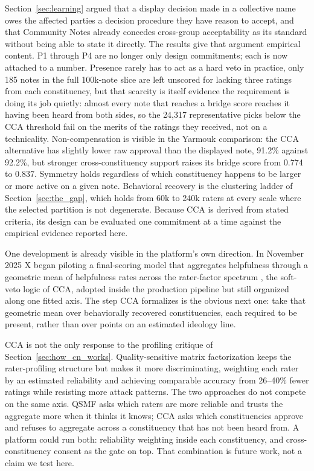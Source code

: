\documentclass[10pt,twocolumn]{article}
\begin{document}
Section~\ref{sec:learning} argued that a display decision made in a
collective name owes the affected parties a decision procedure they have
reason to accept, and that Community Notes already concedes cross-group
acceptability as its standard without being able to state it directly. The
results give that argument empirical content. P1 through P4 are no longer
only design commitments; each is now attached to a number. Presence rarely
has to act as a hard veto in practice, only 185 notes in the full 100k-note
slice are left unscored for lacking three ratings from each constituency, but
that scarcity is itself evidence the requirement is doing its job quietly:
almost every note that reaches a bridge score reaches it having been heard
from both sides, so the 24,317 representative picks below the CCA threshold
fail on the merits of the ratings they received, not on a technicality.
Non-compensation is visible in the Yarmouk comparison: the CCA alternative
has slightly lower raw approval than the displayed note, 91.2\% against
92.2\%, but stronger cross-constituency support raises its bridge score from
0.774 to 0.837. Symmetry
holds regardless of which constituency happens to be larger or more active on
a given note. Behavioral recovery is the clustering ladder of
Section~\ref{sec:the_gap}, which holds from 60k to 240k raters at every scale
where the selected partition is not degenerate. Because CCA is derived from
stated criteria, its design can be evaluated one commitment at a time against
the empirical evidence reported here.

One development is already visible in the platform's own direction. In November
2025 X began piloting a final-scoring model that aggregates helpfulness through a
geometric mean of helpfulness rates across the rater-factor spectrum
\citep{xcommunitynotes2026ranking}, the soft-veto logic of CCA, adopted inside
the production pipeline but still organized along one fitted axis. The step CCA
formalizes is the obvious next one: take that geometric mean over behaviorally
recovered constituencies, each required to be present, rather than over points
on an estimated ideology line.

CCA is not the only response to the profiling critique of Section~\ref{sec:how_cn_works}.
Quality-sensitive matrix factorization \citep{goyal2026qsmf} keeps the
rater-profiling structure but makes it more discriminating, weighting each
rater by an estimated reliability and achieving comparable accuracy from
26--40\% fewer ratings while resisting more attack patterns. The two
approaches do not compete on the same axis. QSMF asks which raters are more
reliable and trusts the aggregate more when it thinks it knows; CCA asks
which constituencies approve and refuses to aggregate across a constituency
that has not been heard from. A platform could run both: reliability
weighting inside each constituency, and cross-constituency consent as the
gate on top. That combination is future work, not a claim we test here.
\end{document}
